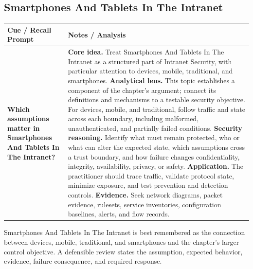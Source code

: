 \documentclass[11pt]{article}
\newcommand{\CornellHeader}{%
\rowcolor{Navy}\color{white}\bfseries Cue / Recall Prompt & \color{white}\bfseries Notes / Analysis\\\hline}
\newcommand{\CornellRow}[2]{%
\cellcolor{CueGray}\RaggedRight\textbf{#1} & \RaggedRight #2\\\hline}
\begin{document}
\subsection*{Smartphones And Tablets In The Intranet}
\begin{longtable}{>{\RaggedRight\arraybackslash}p{}|>{\RaggedRight\arraybackslash}p{}}
\CornellHeader
\CornellRow{Which assumptions matter in Smartphones And Tablets In The Intranet?}{\textbf{Core idea.} Treat Smartphones And Tablets In The Intranet as a structured part of Intranet Security, with particular attention to devices, mobile, traditional, and smartphones. \textbf{Analytical lens.} This topic establishes a component of the chapter's argument; connect its definitions and mechanisms to a testable security objective. For devices, mobile, and traditional, follow traffic and state across each boundary, including malformed, unauthenticated, and partially failed conditions. \textbf{Security reasoning.} Identify what must remain protected, who or what can alter the expected state, which assumptions cross a trust boundary, and how failure changes confidentiality, integrity, availability, privacy, or safety. \textbf{Application.} The practitioner should trace traffic, validate protocol state, minimize exposure, and test prevention and detection controls. \textbf{Evidence.} Seek network diagrams, packet evidence, rulesets, service inventories, configuration baselines, alerts, and flow records.}
\end{longtable}
\begin{topicsummary}
Smartphones And Tablets In The Intranet is best remembered as the connection between devices, mobile, traditional, and smartphones and the chapter's larger control objective. A defensible review states the assumption, expected behavior, evidence, failure consequence, and required response.
\end{topicsummary}
\end{document}
